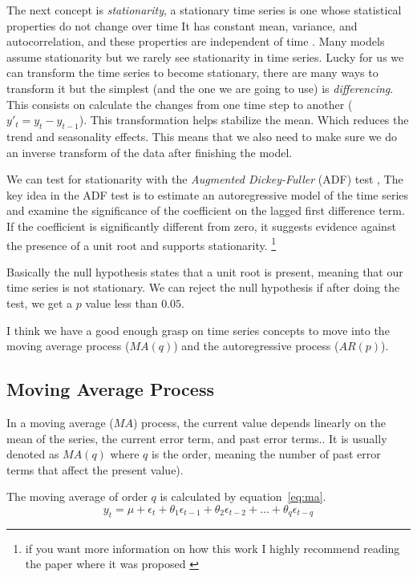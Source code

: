 \documentclass[journal]{IEEEtran}
\begin{document}
The next concept is \emph{stationarity}, a stationary time series is one whose
statistical properties do not change over time It has constant mean, variance,
and autocorrelation, and these properties are independent of time
\cite{timeseries}. Many models assume stationarity but we rarely see
stationarity in time series. Lucky for us we can transform the time series to
become stationary, there are many ways to transform it but the simplest (and
the one we are going to use) is \emph{differencing}. This consists on
calculate the changes from one time step to another ($y'_t = y_t - y_{t-1}$). This transformation helps
stabilize the mean. Which reduces the trend and seasonality effects. This
means that we also need to make sure we do an inverse transform of the data
after finishing the model.

We can test for stationarity with the \emph{Augmented Dickey-Fuller} (ADF) test
\cite{adf}, The key idea in the ADF test is to estimate an autoregressive model
of the time series and examine the significance of the coefficient on the
lagged first difference term. If the coefficient is significantly different
from zero, it suggests evidence against the presence of a unit root and
supports stationarity. \footnote{if you want more information on how this work
I highly recommend reading the paper where it was proposed \cite{adf}}

Basically the null hypothesis states that a unit root is present, meaning that
our time series is not stationary. We can reject the null hypothesis if after
doing the test, we get a $p$ value less than $0.05$.

I think we have a good enough grasp on time series concepts to move into the
moving average process ($MA(q)$) and the autoregressive process ($AR(p)$).

\subsection{Moving Average Process}\label{sub:ma}

In a moving average ($MA$) process, the current value depends linearly on the
mean of the series, the current error term, and past error
terms.\cite{timeseries}. It is usually denoted as $MA(q)$ where $q$ is the
order, meaning the number of past error terms that affect the present value).

The moving average of order $q$ is calculated by equation~\ref{eq:ma}.
\begin{equation}
    y_t = \mu + \epsilon_t + \theta_1\epsilon_{t-1} + \theta_2\epsilon_{t-2} +
            ... +  \theta_q\epsilon_{t-q}
    \label{eq:ma}
\end{equation}
\end{document}
